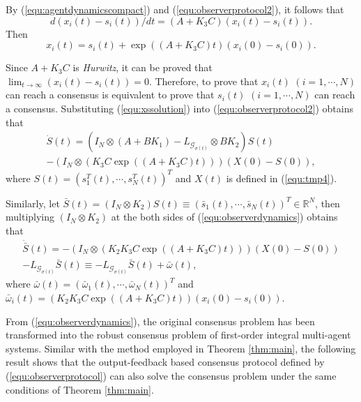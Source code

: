 \documentclass[12pt,draftcls,onecolumn]{IEEEtran}
\begin{document}
By (\ref{equ:agentdynamicscompact}) and (\ref{equ:observerprotocol2}), it follows that
\begin{displaymath}
d(x_i(t) - s_i(t))/dt = (A+K_3C)(x_i(t) - s_i(t)).
\end{displaymath}
Then
\begin{equation}\label{equ:xssolution}
x_i(t) = s_i(t) + \exp((A+K_3C)t)(x_i(0)-s_i(0)).
\end{equation}

Since $A+K_3C$ is \emph{Hurwitz}, it can be proved that $\lim_{t\to\infty}(x_i(t)-s_i(t)) = 0$. Therefore, to prove that $x_i(t)$ $(i=1,\cdots,N)$ can reach a consensus is equivalent to prove that $s_i(t)$ $(i=1,\cdots,N)$ can reach a consensus. Substituting (\ref{equ:xssolution}) into (\ref{equ:observerprotocol2}) obtains that
\begin{multline}\label{equ:observerdynamics}
\dot{S}(t) = (I_N\otimes(A+BK_1) - L_{\mathcal{G}_{\sigma(t)}}\otimes BK_2)S(t)\\ - (I_N\otimes(K_3C\exp((A+K_3C)t)))(X(0)-S(0)),
\end{multline}
where $S(t) = (s^T_1(t),\cdots,s^T_N(t))^T$ and $X(t)$ is defined in (\ref{equ:tmp4}).

Similarly, let $\bar{S}(t)  = (I_N\otimes K_2)S(t) \equiv (\bar{s}_1(t),\cdots,\bar{s}_N(t))^T \in \mathbb{R}^N$, then multiplying $(I_N\otimes K_2)$ at the both sides of (\ref{equ:observerdynamics}) obtains that
\begin{multline}\label{equ:observerdynamics}
\dot{\bar{S}}(t) =  - (I_N\otimes(K_2K_3C\exp((A+K_3C)t)))(X(0)-S(0)) \\-L_{\mathcal{G}_{\sigma(t)}}\bar{S}(t) \equiv -L_{\mathcal{G}_{\sigma(t)}}\bar{S}(t) + \bar{\omega}(t),
\end{multline}
where $\bar{\omega}(t) = (\bar{\omega}_1(t),\cdots,\bar{\omega}_N(t))^T$ and $\bar{\omega}_i(t) = (K_2K_3C\exp((A+K_3C)t))(x_i(0)-s_i(0))$.

From (\ref{equ:observerdynamics}), the original consensus problem has been transformed into the robust consensus problem of first-order integral multi-agent systems. Similar with the method employed in Theorem \ref{thm:main}, the following result shows that the output-feedback based consensus protocol defined by (\ref{equ:observerprotocol}) can also solve the consensus problem under the same conditions of Theorem \ref{thm:main}.
\end{document}
